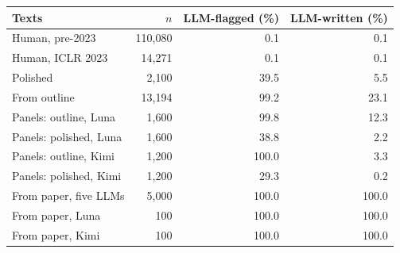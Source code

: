 \begin{tabular}{@{}lrrr@{}}
\toprule
Texts & $n$ & LLM-flagged (\%) & LLM-written (\%) \\
\midrule
Human, pre-2023 & 110,080 & 0.1 & 0.1 \\
Human, ICLR 2023 & 14,271 & 0.1 & 0.1 \\
Polished & 2,100 & 39.5 & 5.5 \\
From outline & 13,194 & 99.2 & 23.1 \\
Panels: outline, Luna & 1,600 & 99.8 & 12.3 \\
Panels: polished, Luna & 1,600 & 38.8 & 2.2 \\
Panels: outline, Kimi & 1,200 & 100.0 & 3.3 \\
Panels: polished, Kimi & 1,200 & 29.3 & 0.2 \\
From paper, five LLMs & 5,000 & 100.0 & 100.0 \\
From paper, Luna & 100 & 100.0 & 100.0 \\
From paper, Kimi & 100 & 100.0 & 100.0 \\
\bottomrule
\end{tabular}
